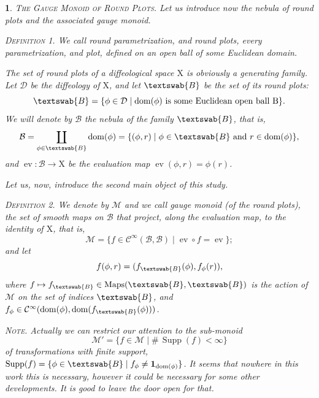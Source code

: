 \documentclass[12pt,reqno]{amsart}
\theoremstyle{article}
\newtheorem{article}{}
\def\artlabel[#1]{\textsc{#1}.}
\def \B{\mathrm B}
\def \X{\mathrm X}
\newcommand{\cB}{{\mathcal B}}
\newcommand{\cD}{{\mathcal D}}
\newcommand{\cM}{\mathcal{M}}
\newcommand{\fB}{\textswab{B}}
\newcommand{\Cinfty}{{\mathcal C}^{\infty}}
\DeclareMathOperator{\dom}{dom}
\DeclareMathOperator{\ev}{ev}
\newcommand{\id}{{\bf 1}}
\DeclareMathOperator{\Maps}{Maps}
\DeclareMathOperator{\Supp}{Supp}
\begin{document}
  \begin{article}\artlabel[The Gauge Monoid of Round Plots]
    \label{The-Gauge-Monoid-of-Round-Plots}
    Let us introduce now the \emph{nebula of round plots} and the associated \emph{gauge monoid}.
    
    \textsc{Definition 1.} \textit{We call \emph{round parametrization},
    and \emph{round plots},
    every parametrization,
    and plot,
    defined on an open ball of some Euclidean domain.}
    
    The set of round plots of a diffeological space $\X$ is obviously a generating family.
    Let $\cD$ be the diffeology of $\X$,
    and let $\fB$ be the set of its round plots:
    $$
    \fB = \{ \phi \in \cD \mid \dom(\phi) \text{ is some Euclidean open ball $\B$} \}.
    $$
    We will denote by $\cB$ the nebula of the family $\fB$,
    that is,
    $$
    \cB = \coprod_{\phi \in \fB} \dom(\phi) = \{ (\phi, r) \mid \phi \in \fB \text{ and } r \in \dom(\phi) \},
    $$
    and $\ev \colon \cB \to \X$ be the evaluation map $\ev(\phi,r) = \phi(r)$.
    
    Let us,
    now,
    introduce the second main object of this study.
    
    \textsc{Definition 2.} \textit{We denote by $\cM$ and we call \emph{gauge monoid} (of the round plots),
    the set of smooth maps on $\cB$ that project,
    along the evaluation map,
    to the identity of $\X$,
    that is,
    $$
    \cM = \{ f \in \Cinfty(\cB,\cB) \mid \ev \circ f = \ev \};
    $$
    }
    and let
    $$
    f(\phi,r) = (f_\fB(\phi), f_\phi(r)),
    $$
    where $f \mapsto f_\fB \in \Maps(\fB,\fB)$ is the action of $\cM$ on the set of indices $\fB$,
    and $f_\phi \in \Cinfty(\dom(\phi), \dom(f_\fB(\phi)))$.
    
    \textsc{Note.} Actually we can restrict our attention to the sub-monoid
    $$
    \cM' = \{ f\in \cM\mid \#\, \Supp(f) < \infty \}
    $$
    of transformations with finite support,
    $\Supp(f) = \{ \phi \in \fB \mid f_\phi \neq \id_{\dom(\phi)} \}$.
    It seems that nowhere in this work this is necessary,
    however it could be necessary for some other developments.
    It is good to leave the door open for that.
  \end{article}
  
\end{document}
